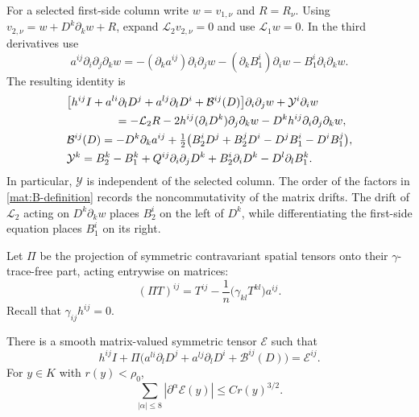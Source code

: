 For a selected first-side column write $w=v_{1,\nu}$ and $R=R_\nu$.
Using $v_{2,\nu}=w+D^k\partial_kw+R$, expand
$\mathcal L_2v_{2,\nu}=0$ and use
$\mathcal L_1w=0$.  In the third derivatives use
\[
 a^{ij}\partial_i\partial_j\partial_kw
   =-(\partial_ka^{ij})\partial_i\partial_jw
     -(\partial_kB_1^i)\partial_iw
     -B_1^i\partial_i\partial_kw.
\]
The resulting identity is
\begin{align}
 &\big[h^{ij}I+a^{li}\partial_lD^j+a^{lj}\partial_lD^i
                           +\mathcal B^{ij}(D)\big]
                               \partial_i\partial_jw
            +\mathcal Y^i\partial_iw\notag\\
 &\hspace{15mm}=-\mathcal L_2R
       -2h^{ij}(\partial_iD^k)\partial_j\partial_kw
       -D^kh^{ij}\partial_i\partial_j\partial_kw,
 \label{mat:comparison-identity}\\
 &\mathcal B^{ij}(D)
       =-D^k\partial_ka^{ij}
        +\tfrac12\big(B_2^iD^j+B_2^jD^i
                              -D^jB_1^i-D^iB_1^j\big),
 \label{mat:B-definition}\\
 &\mathcal Y^k=B_2^k-B_1^k
       +Q^{ij}\partial_i\partial_jD^k
       +B_2^i\partial_iD^k-D^l\partial_lB_1^k.
 \label{mat:Y-definition}
\end{align}
In particular, $\mathcal Y$ is independent of the selected column.
The order of the factors in \eqref{mat:B-definition} records the
noncommutativity of the matrix drifts.  The drift of $\mathcal L_2$ acting on
$D^k\partial_kw$ places $B_2^i$ on the left of $D^k$, while
differentiating the first-side equation places $B_1^i$ on its right.

Let $\Pi$ be the projection of symmetric contravariant spatial
tensors onto their $\gamma$-trace-free part, acting entrywise on
matrices:
\[
 (\Pi T)^{ij}=T^{ij}
       -\frac1n\big(\gamma_{kl}T^{kl}\big)a^{ij}.
\]
Recall that $\gamma_{ij}h^{ij}=0$.

\begin{lemma}
\label{mat:projected-equation}
There is a smooth matrix-valued symmetric tensor $\mathcal E$ such
that
\begin{equation}
 h^{ij}I+
 \Pi\big(a^{li}\partial_lD^j+a^{lj}\partial_lD^i
                           +\mathcal B^{ij}(D)\big)
                     =\mathcal E^{ij}.
 \label{mat:projected}
\end{equation}
For $y\in K$ with $r(y)<\rho_0$,
\begin{equation}
       \sum_{|\alpha|\le8}|\partial^\alpha\mathcal E(y)|
                                      \le Cr(y)^{3/2}.
 \label{mat:E-bound}
\end{equation}
\end{lemma}

